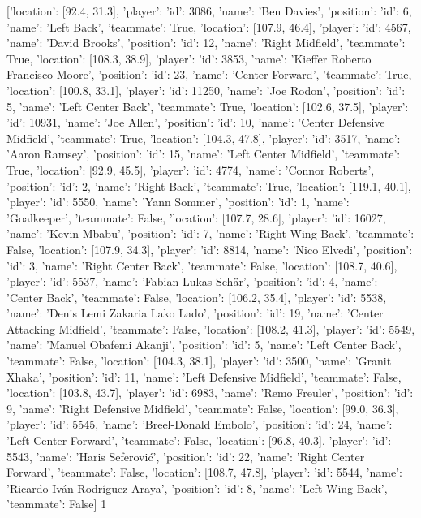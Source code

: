 [{'location': [92.4, 31.3], 'player': {'id': 3086, 'name': 'Ben Davies'}, 'position': {'id': 6, 'name': 'Left Back'}, 'teammate': True}, {'location': [107.9, 46.4], 'player': {'id': 4567, 'name': 'David Brooks'}, 'position': {'id': 12, 'name': 'Right Midfield'}, 'teammate': True}, {'location': [108.3, 38.9], 'player': {'id': 3853, 'name': 'Kieffer Roberto Francisco Moore'}, 'position': {'id': 23, 'name': 'Center Forward'}, 'teammate': True}, {'location': [100.8, 33.1], 'player': {'id': 11250, 'name': 'Joe Rodon'}, 'position': {'id': 5, 'name': 'Left Center Back'}, 'teammate': True}, {'location': [102.6, 37.5], 'player': {'id': 10931, 'name': 'Joe Allen'}, 'position': {'id': 10, 'name': 'Center Defensive Midfield'}, 'teammate': True}, {'location': [104.3, 47.8], 'player': {'id': 3517, 'name': 'Aaron Ramsey'}, 'position': {'id': 15, 'name': 'Left Center Midfield'}, 'teammate': True}, {'location': [92.9, 45.5], 'player': {'id': 4774, 'name': 'Connor Roberts'}, 'position': {'id': 2, 'name': 'Right Back'}, 'teammate': True}, {'location': [119.1, 40.1], 'player': {'id': 5550, 'name': 'Yann Sommer'}, 'position': {'id': 1, 'name': 'Goalkeeper'}, 'teammate': False}, {'location': [107.7, 28.6], 'player': {'id': 16027, 'name': 'Kevin Mbabu'}, 'position': {'id': 7, 'name': 'Right Wing Back'}, 'teammate': False}, {'location': [107.9, 34.3], 'player': {'id': 8814, 'name': 'Nico Elvedi'}, 'position': {'id': 3, 'name': 'Right Center Back'}, 'teammate': False}, {'location': [108.7, 40.6], 'player': {'id': 5537, 'name': 'Fabian Lukas Schär'}, 'position': {'id': 4, 'name': 'Center Back'}, 'teammate': False}, {'location': [106.2, 35.4], 'player': {'id': 5538, 'name': 'Denis Lemi Zakaria Lako Lado'}, 'position': {'id': 19, 'name': 'Center Attacking Midfield'}, 'teammate': False}, {'location': [108.2, 41.3], 'player': {'id': 5549, 'name': 'Manuel Obafemi Akanji'}, 'position': {'id': 5, 'name': 'Left Center Back'}, 'teammate': False}, {'location': [104.3, 38.1], 'player': {'id': 3500, 'name': 'Granit Xhaka'}, 'position': {'id': 11, 'name': 'Left Defensive Midfield'}, 'teammate': False}, {'location': [103.8, 43.7], 'player': {'id': 6983, 'name': 'Remo Freuler'}, 'position': {'id': 9, 'name': 'Right Defensive Midfield'}, 'teammate': False}, {'location': [99.0, 36.3], 'player': {'id': 5545, 'name': 'Breel-Donald Embolo'}, 'position': {'id': 24, 'name': 'Left Center Forward'}, 'teammate': False}, {'location': [96.8, 40.3], 'player': {'id': 5543, 'name': 'Haris Seferović'}, 'position': {'id': 22, 'name': 'Right Center Forward'}, 'teammate': False}, {'location': [108.7, 47.8], 'player': {'id': 5544, 'name': 'Ricardo Iván Rodríguez Araya'}, 'position': {'id': 8, 'name': 'Left Wing Back'}, 'teammate': False}]                                                                                                                                                                                             1
